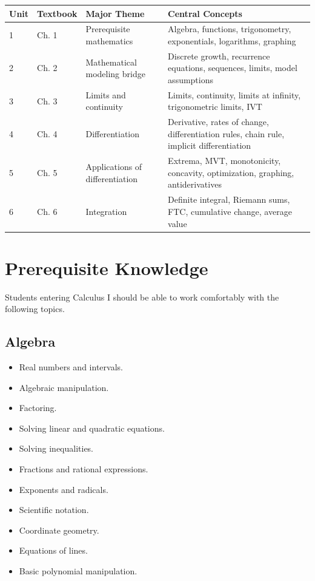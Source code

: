 \documentclass[11pt]{article}
\begin{document}
\begin{longtable}{p{0.8cm}p{3.0cm}p{4.0cm}p{5.2cm}}
\toprule
\textbf{Unit} & \textbf{Textbook} & \textbf{Major Theme}
& \textbf{Central Concepts} \\
\midrule
1 & Ch. 1 & Prerequisite mathematics
& Algebra, functions, trigonometry, exponentials, logarithms, graphing \\

2 & Ch. 2 & Mathematical modeling bridge
& Discrete growth, recurrence equations, sequences, limits, model assumptions \\

3 & Ch. 3 & Limits and continuity
& Limits, continuity, limits at infinity, trigonometric limits, IVT \\

4 & Ch. 4 & Differentiation
& Derivative, rates of change, differentiation rules, chain rule, implicit differentiation \\

5 & Ch. 5 & Applications of differentiation
& Extrema, MVT, monotonicity, concavity, optimization, graphing, antiderivatives \\

6 & Ch. 6 & Integration
& Definite integral, Riemann sums, FTC, cumulative change, average value \\

\bottomrule
\end{longtable}

\section{Prerequisite Knowledge}

Students entering Calculus I should be able to work comfortably with the
following topics.

\subsection{Algebra}

\begin{itemize}
    \item Real numbers and intervals.
    \item Algebraic manipulation.
    \item Factoring.
    \item Solving linear and quadratic equations.
    \item Solving inequalities.
    \item Fractions and rational expressions.
    \item Exponents and radicals.
    \item Scientific notation.
    \item Coordinate geometry.
    \item Equations of lines.
    \item Basic polynomial manipulation.
\end{itemize}
\end{document}

